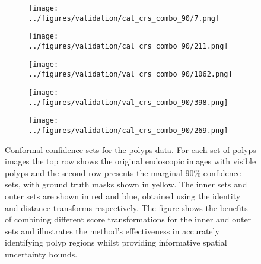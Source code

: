 \begin{figure}[h!]
\begin{subfigure}[b]{0.03\textwidth}
	\end{subfigure}
	\hspace{0.2cm}
	\begin{subfigure}{0.18\textwidth}
		\centering
		\texttt{[image: ../figures/validation/cal\_crs\_combo\_90/7.png]}
		\label{fig:1}
	\end{subfigure}
	\begin{subfigure}{0.18\textwidth}
		\centering
		\texttt{[image: ../figures/validation/cal\_crs\_combo\_90/211.png]}
		\label{fig:1}
	\end{subfigure}
	\begin{subfigure}{0.18\textwidth}
		\centering
		\texttt{[image: ../figures/validation/val\_crs\_combo\_90/1062.png]}
		\label{fig:1}
	\end{subfigure}
	\begin{subfigure}{0.18\textwidth}
		\centering
		\texttt{[image: ../figures/validation/val\_crs\_combo\_90/398.png]}
		\label{fig:1}
	\end{subfigure}
	\begin{subfigure}{0.18\textwidth}
		\centering
		\texttt{[image: ../figures/validation/cal\_crs\_combo\_90/269.png]}
		\label{fig:1}
	\end{subfigure}
	\label{fig:grid}
	\vspace{-0.3cm}
	\caption{Conformal confidence sets for the polyps data. For each set of polyps images the top row shows the original endoscopic images with visible polyps and the second row presents the marginal 90\% confidence sets, with ground truth masks shown in yellow. The inner sets and outer sets are shown in red and blue, obtained using the identity and distance transforms respectively. The figure shows the benefits of combining different score transformations for the inner and outer sets and illustrates the method's effectiveness in accurately identifying polyp regions whilst providing informative spatial uncertainty bounds.}\label{fig:res}
	\vspace{-0.4cm}
\end{figure}
